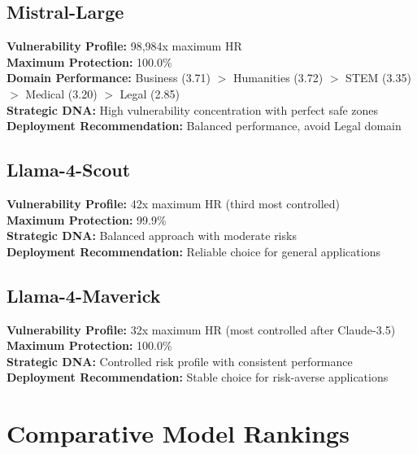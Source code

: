 \documentclass[letterpaper]{article}
\begin{document}
\subsection{Mistral-Large}
\textbf{Vulnerability Profile:} 98,984x maximum HR\\
\textbf{Maximum Protection:} 100.0\%\\
\textbf{Domain Performance:} Business (3.71) $>$ Humanities (3.72) $>$ STEM (3.35) $>$ Medical (3.20) $>$ Legal (2.85)\\
\textbf{Strategic DNA:} High vulnerability concentration with perfect safe zones\\
\textbf{Deployment Recommendation:} Balanced performance, avoid Legal domain

\subsection{Llama-4-Scout}
\textbf{Vulnerability Profile:} 42x maximum HR (third most controlled)\\
\textbf{Maximum Protection:} 99.9\%\\
\textbf{Strategic DNA:} Balanced approach with moderate risks\\
\textbf{Deployment Recommendation:} Reliable choice for general applications

\subsection{Llama-4-Maverick}
\textbf{Vulnerability Profile:} 32x maximum HR (most controlled after Claude-3.5)\\
\textbf{Maximum Protection:} 100.0\%\\
\textbf{Strategic DNA:} Controlled risk profile with consistent performance\\
\textbf{Deployment Recommendation:} Stable choice for risk-averse applications

\section{Comparative Model Rankings}
\label{sec:comparative_rankings}
\end{document}

